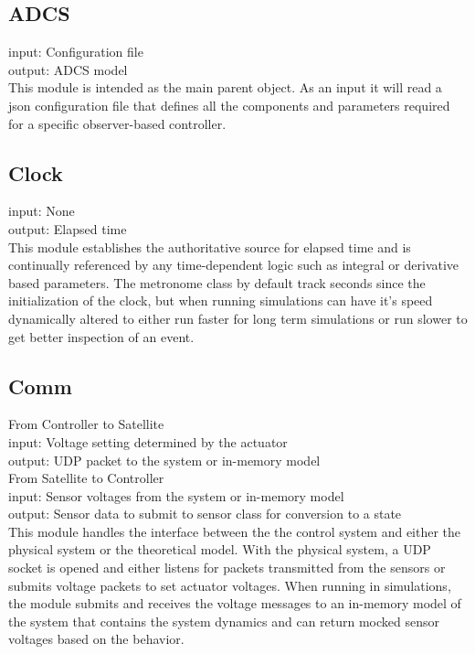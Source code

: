 \subsection{ADCS}
\label{subsec:ADCS}

input: Configuration file\\
output: ADCS model\\

This module is intended as the main parent object.  As an input it will read a json configuration file that defines all the components and parameters required for a specific observer-based controller.


\subsection{Clock}
\label{subsec:Clock}

input: None\\
output: Elapsed time\\

This module establishes the authoritative source for elapsed time and is continually referenced by any time-dependent logic such as integral or derivative based parameters. The metronome class by default track seconds since the initialization of the clock, but when running simulations can have it's speed dynamically altered to either run faster for long term simulations or run slower to get better inspection of an event.


\subsection{Comm}
\label{subsec:Comm}

From Controller to Satellite\\
input: Voltage setting determined by the actuator\\
output: UDP packet to the system or in-memory model\\
From Satellite to Controller\\
input: Sensor voltages from the system or in-memory model\\
output: Sensor data to submit to sensor class for conversion to a state\\

This module handles the interface between the the control system and either the physical system or the theoretical model. With the physical system, a UDP socket is opened and either listens for packets transmitted from the sensors or submits voltage packets to set actuator voltages. When running in simulations, the module submits and receives the voltage messages to an in-memory model of the system that contains the system dynamics and can return mocked sensor voltages based on the behavior.


